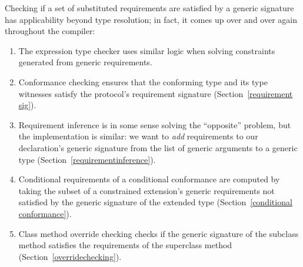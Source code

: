 \documentclass[a4paper,headsepline,bibliography=totoc,toc=flat,fleqn,twoside=semi]{scrbook}
\theoremstyle{definition}
\theoremstyle{definition}
\theoremstyle{definition}
\begin{document}
Checking if a set of substituted requirements are satisfied by a generic signature has applicability beyond type resolution; in fact, it comes up over and over again throughout the compiler:
\begin{enumerate}
\item The expression type checker uses similar logic when solving constraints generated from generic requirements.
\item Conformance checking ensures that the conforming type and its type witnesses satisfy the protocol's requirement signature (Section~\ref{requirement sig}).
\item Requirement inference is in some sense solving the ``opposite'' problem, but the implementation is similar: we want to \emph{add} requirements to our declaration's generic signature from the list of generic arguments to a generic type (Section~\ref{requirementinference}).
\item Conditional requirements of a conditional conformance are computed by taking the subset of a constrained extension's generic requirements not satisfied by the generic signature of the extended type (Section~\ref{conditional conformance}).
\item Class method override checking checks if the generic signature of the subclass method satisfies the requirements of the superclass method (Section~\ref{overridechecking}).
\end{enumerate}
\end{document}
